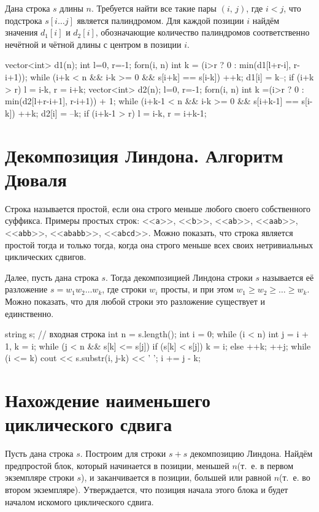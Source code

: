 \documentclass[12pt, titlepage]{article}
\renewcommand{\tt}[1]{\texttt{\small #1}}
\begin{document}
Дана строка $s$ длины $n$. Требуется найти все такие пары $(i,\,j)$, где $i<j$, что подстрока $s[i\ldots j]$ является палиндромом. Для каждой позиции $i$ найдём значения $d_1[i]$ и $d_2[i]$, обозначающие количество палиндромов соответственно нечётной и чётной длины с центром в позиции $i$.

\begin{cppcode}
vector<int> d1(n);
int l=0, r=-1;
forn(i, n) {
    int k = (i>r ? 0 : min(d1[l+r-i], r-i+1));
    while (i+k < n && i-k >= 0 && s[i+k] == s[i-k])  ++k;
    d1[i] = k--;
    if (i+k > r)
        l = i-k,  r = i+k;
}
vector<int> d2(n);
l=0, r=-1;
forn(i, n) {
    int k =(i>r ? 0 : min(d2[l+r-i+1], r-i+1)) + 1;
    while (i+k-1 < n && i-k >= 0 && s[i+k-1] == s[i-k])  ++k;
    d2[i] = --k;
    if (i+k-1 > r)
        l = i-k, r = i+k-1;
}
\end{cppcode}

\section{Декомпозиция Линдона. Алгоритм Дюваля}

Строка называется простой, если она строго меньше любого своего собственного суффикса. Примеры простых строк: <<\tt{a}>>, <<\tt{b}>>, <<\tt{ab}>>, <<\tt{aab}>>, <<\tt{abb}>>, <<\tt{ababb}>>, <<\tt{abcd}>>. Можно показать, что строка является простой тогда и только тогда, когда она строго меньше всех своих нетривиальных циклических сдвигов.

Далее, пусть дана строка $s$. Тогда декомпозицией Линдона строки $s$ называется её разложение $s=w_1w_2\ldots w_k$, где строки $w_i$ просты, и при этом $w_1 \ge w_2 \ge \ldots \ge w_k$. Можно показать, что для любой строки  это разложение существует и единственно.

\begin{cppcode}
string s; // входная строка
int n = s.length();
int i = 0;
while (i < n) {
    int j = i + 1, k = i;
    while (j < n && s[k] <= s[j]) {
        if (s[k] < s[j])
            k = i;
        else
            ++k;
        ++j;
    }
    while (i <= k) {
        cout << s.substr(i, j-k) << ' ';
        i += j - k;
    }
}
\end{cppcode}


\section{Нахождение наименьшего циклического сдвига}

Пусть дана строка $s$. Построим для строки $s+s$ декомпозицию Линдона. Найдём предпростой блок, который начинается в позиции, меньшей $n$(т.~е. в первом экземпляре строки $s$), и заканчивается в позиции, большей или равной $n$(т.~е. во втором экземпляре). Утверждается, что позиция начала этого блока и будет началом искомого циклического сдвига.
\end{document}
